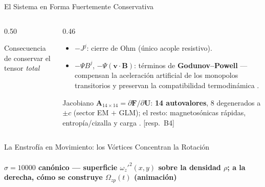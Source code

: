 \documentclass[aspectratio=169,9pt]{beamer}
\begin{document}
\begin{frame}{El Sistema en Forma Fuertemente Conservativa}
\begin{columns}[T]
\begin{column}{0.50\textwidth}
\begin{block}{Consecuencia de conservar el tensor \emph{total}}
  \end{block}
\end{column}
\begin{column}{0.46\textwidth}
  \pause
  \begin{tcolorbox}[EQ={Vector fuente}]
    \scriptsize
    \begin{center}
    \end{center}
    \begin{itemize}\setlength\itemsep{1pt}
      \item $-J^j$: cierre de Ohm (\'unico acople resistivo).
      \item $-\Psi B^j$, $-\Psi(\mathbf v\!\cdot\!\mathbf B)$: t\'erminos de
            \textbf{Godunov--Powell} --- compensan la aceleraci\'on
            artificial de los monopolos transitorios y preservan la
            compatibilidad termodin\'amica \citep{ruedaramirez2023}.
    \end{itemize}
  \end{tcolorbox}
  \pause\vspace{0.08cm}
  \begin{tcolorbox}[HYP={Estructura caracter\'istica}]
    \scriptsize
    Jacobiano $\mathbf A_{14\times14}=\partial\mathbf F/\partial\mathbf U$:
    \textbf{14 autovalores}, 8 degenerados a $\pm c$ (sector EM $+$ GLM);
    el resto: magnetos\'onicas r\'apidas, entrop\'ia/cizalla y carga
    \citep{miranda-aranguren-2018}. \hfill{\tiny[resp.\ B4]}
  \end{tcolorbox}
\end{column}
\end{columns}
\end{frame}

\begin{frame}{La Enstrof\'ia en Movimiento: los V\'ortices Concentran la Rotaci\'on}
\framesubtitle{$\sigma=10000$ can\'onico --- superficie $\omega_z'^{2}(x,y)$ sobre la densidad $\rho$; a la derecha, c\'omo se construye $\Omega_{zp}(t)$ (animaci\'on)}
\begin{center}
\end{center}
\end{frame}
\end{document}
